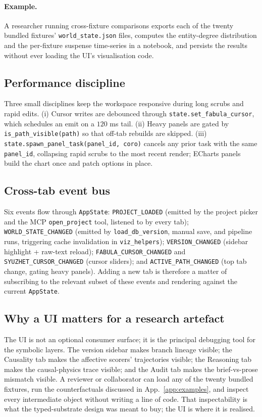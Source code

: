 \documentclass[11pt]{article}
\begin{document}
\paragraph{Example.} A researcher running cross-fixture
comparisons exports each of the twenty bundled fixtures'
\texttt{world\_state.json} files, computes the entity-degree
distribution and the per-fixture suspense time-series in a
notebook, and persists the results without ever loading the UI's
visualisation code.

\subsection{Performance discipline}
\label{app:ui-perf}

Three small disciplines keep the workspace responsive during
long scrubs and rapid edits. (i) Cursor writes are debounced
through \texttt{state.set\_fabula\_cursor}, which schedules an
emit on a $120$ ms tail. (ii) Heavy panels are gated by
\texttt{is\_path\_visible(path)} so that off-tab rebuilds are
skipped. (iii) \texttt{state.spawn\_panel\_task(panel\_id, coro)}
cancels any prior task with the same \texttt{panel\_id},
collapsing rapid scrubs to the most recent render; ECharts panels
build the chart once and patch options in place.

\subsection{Cross-tab event bus}
\label{app:ui-events}

Six events flow through \texttt{AppState}: \texttt{PROJECT\_LOADED}
(emitted by the project picker and the MCP \texttt{open\_project}
tool, listened to by every tab); \texttt{WORLD\_STATE\_CHANGED}
(emitted by \texttt{load\_db\_version}, manual save, and pipeline
runs, triggering cache invalidation in \texttt{viz\_helpers});
\texttt{VERSION\_CHANGED} (sidebar highlight + raw-text reload);
\texttt{FABULA\_CURSOR\_CHANGED} and
\texttt{SYUZHET\_CURSOR\_CHANGED} (cursor sliders); and
\texttt{ACTIVE\_PATH\_CHANGED} (top tab change, gating heavy
panels). Adding a new tab is therefore a matter of subscribing to
the relevant subset of these events and rendering against the
current \texttt{AppState}.

\subsection{Why a UI matters for a research artefact}
\label{app:ui-why}

The UI is not an optional consumer surface; it is the principal
debugging tool for the symbolic layers. The version sidebar
makes branch lineage visible; the Causality tab makes the
affective scorers' trajectories visible; the Reasoning tab makes
the causal-physics trace visible; and the Audit tab makes the
brief-vs-prose mismatch visible. A reviewer or collaborator can
load any of the twenty bundled fixtures, run the
counterfactuals discussed in App.~\ref{app:examples}, and
inspect every intermediate object without writing a line of code.
That inspectability is what the typed-substrate design was meant
to buy; the UI is where it is realised.
\end{document}
